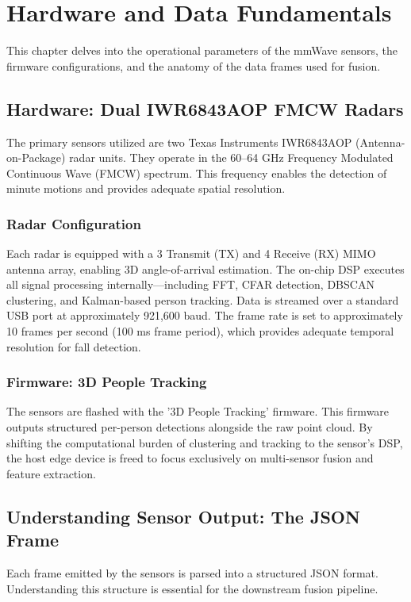 \chapter{Hardware and Data Fundamentals}
This chapter delves into the operational parameters of the mmWave sensors, the firmware configurations, and the anatomy of the data frames used for fusion.

\section{Hardware: Dual IWR6843AOP FMCW Radars}
The primary sensors utilized are two Texas Instruments IWR6843AOP (Antenna-on-Package) radar units. They operate in the 60–64 GHz Frequency Modulated Continuous Wave (FMCW) spectrum. This frequency enables the detection of minute motions and provides adequate spatial resolution.

\subsection{Radar Configuration}
Each radar is equipped with a 3 Transmit (TX) and 4 Receive (RX) MIMO antenna array, enabling 3D angle-of-arrival estimation. The on-chip DSP executes all signal processing internally—including FFT, CFAR detection, DBSCAN clustering, and Kalman-based person tracking. Data is streamed over a standard USB port at approximately 921,600 baud. The frame rate is set to approximately 10 frames per second (100 ms frame period), which provides adequate temporal resolution for fall detection.

\subsection{Firmware: 3D People Tracking}
The sensors are flashed with the '3D People Tracking' firmware. This firmware outputs structured per-person detections alongside the raw point cloud. By shifting the computational burden of clustering and tracking to the sensor's DSP, the host edge device is freed to focus exclusively on multi-sensor fusion and feature extraction.

\section{Understanding Sensor Output: The JSON Frame}
Each frame emitted by the sensors is parsed into a structured JSON format. Understanding this structure is essential for the downstream fusion pipeline.

